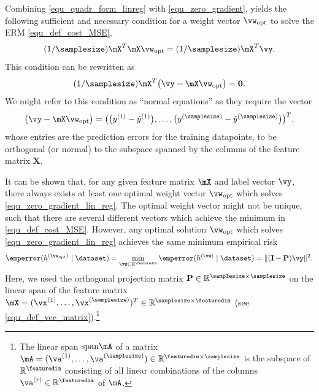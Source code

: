\documentclass[12pt]{report}
\begin{document}
Combining \eqref{equ_quadr_form_linreg} with \eqref{equ_zero_gradient}, 
yields the following sufficient and necessary condition for a weight vector 
$\vw_{\rm opt}$ to solve the ERM \eqref{equ_def_cost_MSE},
\begin{equation}
\label{equ_zero_gradient_lin_reg}
(1/\samplesize) \mX^{T} \mX \vw_{\rm opt} = (1/\samplesize) \mX^{T} \vy.  
\end{equation} 
This condition can be rewritten as 
\begin{equation}
\label{equ_zero_gradient_lin_reg_normal_condition}
(1/\samplesize) \mX^{T} \big( \vy - \mX \vw_{\rm opt} \big) = \mathbf{0}.  
\end{equation} 
We might refer to this condition as ``normal equations'' as they 
require the vector $$\big( \vy - \mX \vw_{\rm opt} \big) = \big(\big(y^{(1)}-\hat{y}^{(1)}\big),\ldots,\big(y^{(\samplesize)}-\hat{y}^{(\samplesize)}\big)  \big)^{T},$$
whose entries are the prediction errors for the training datapoints, to 
be orthogonal (or normal) to the subspace spanned by the columns 
of the feature matrix $\mathbf{X}$. 


It can be shown that, for any given feature matrix $\mX$ and label vector $\vy$, there always 
exists at least one optimal weight vector $\vw_{\rm opt}$ which solves \eqref{equ_zero_gradient_lin_reg}. 
The optimal weight vector might not be unique, such that there are several different vectors 
which achieve the minimum in \eqref{equ_def_cost_MSE}. However, any optimal solution $\vw_{\rm opt}$ 
which solves \eqref{equ_zero_gradient_lin_reg} achieves the same minimum empirical risk 
\begin{equation}
\label{equ_emp_risk_lin_proje}
\emperror(h^{(\vw_{\rm opt})} \mid \dataset) = \min_{\vw \in \mathbb{R}^{\featuredim}} \emperror(h^{(\vw)} \mid \dataset) = \|  (\mathbf{I}- \mathbf{P}) \vy \|^{2}.
\end{equation} 
Here, we used the orthogonal projection matrix $\mathbf{P} \in \mathbb{R}^{\samplesize \times \samplesize}$ on the linear span of the 
feature matrix $\mX = (\vx^{(1)},\ldots,\vx^{(\samplesize)})^{T} \in \mathbb{R}^{\samplesize \times \featuredim}$ (see \eqref{equ_def_vec_matrix}).\footnote{The linear span ${\rm span } \mA$ 
of a matrix $\mA=(\va^{(1)},\ldots,\va^{(\samplesize)}) \in \mathbb{R}^{\featuredim \times \samplesize}$ is the subspace of $\mathbb{R}^{\featuredim}$ consisting of 
all linear combinations of the columns $\va^{(r)} \in \mathbb{R}^{\featuredim}$ of $\mA$.} 
\end{document}
